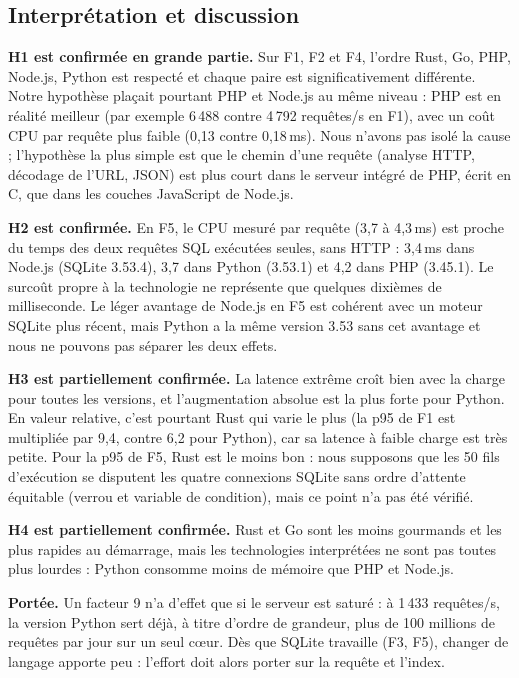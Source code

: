 \subsection{Interprétation et discussion}
\textbf{H1 est confirmée en grande partie.} Sur F1, F2 et F4, l'ordre Rust, Go, PHP, Node.js, Python est respecté et
chaque paire est significativement différente. Notre hypothèse plaçait pourtant PHP et Node.js au même niveau : PHP
est en réalité meilleur (par exemple 6\,488 contre 4\,792 requêtes/s en F1), avec un coût CPU par requête plus faible
(0,13 contre 0,18\,ms). Nous n'avons pas isolé la cause ; l'hypothèse la plus simple est que le chemin d'une requête
(analyse HTTP, décodage de l'URL, JSON) est plus court dans le serveur intégré de PHP, écrit en C, que dans les
couches JavaScript de Node.js.

\textbf{H2 est confirmée.} En F5, le CPU mesuré par requête (3,7 à 4,3\,ms) est proche du temps des deux requêtes SQL
exécutées seules, sans HTTP : 3,4\,ms dans Node.js (SQLite 3.53.4), 3,7 dans Python (3.53.1) et 4,2 dans PHP
(3.45.1). Le surcoût propre à la technologie ne représente que quelques dixièmes de milliseconde. Le léger avantage
de Node.js en F5 est cohérent avec un moteur SQLite plus récent, mais Python a la même version 3.53 sans cet avantage
et nous ne pouvons pas séparer les deux effets.

\textbf{H3 est partiellement confirmée.} La latence extrême croît bien avec la charge pour toutes les versions, et
l'augmentation absolue est la plus forte pour Python. En valeur relative, c'est pourtant Rust qui varie le plus (la
p95 de F1 est multipliée par 9,4, contre 6,2 pour Python), car sa latence à faible charge est très petite. Pour la
p95 de F5, Rust est le moins bon : nous supposons que les 50 fils d'exécution se disputent les quatre connexions
SQLite sans ordre d'attente équitable (verrou et variable de condition), mais ce point n'a pas été vérifié.

\textbf{H4 est partiellement confirmée.} Rust et Go sont les moins gourmands et les plus rapides au démarrage, mais
les technologies interprétées ne sont pas toutes plus lourdes : Python consomme moins de mémoire que PHP et Node.js.

\textbf{Portée.} Un facteur 9 n'a d'effet que si le serveur est saturé : à 1\,433 requêtes/s, la version Python sert
déjà, à titre d'ordre de grandeur, plus de 100 millions de requêtes par jour sur un seul cœur. Dès que SQLite travaille
(F3, F5), changer de langage apporte peu : l'effort doit alors porter sur la requête et l'index.

